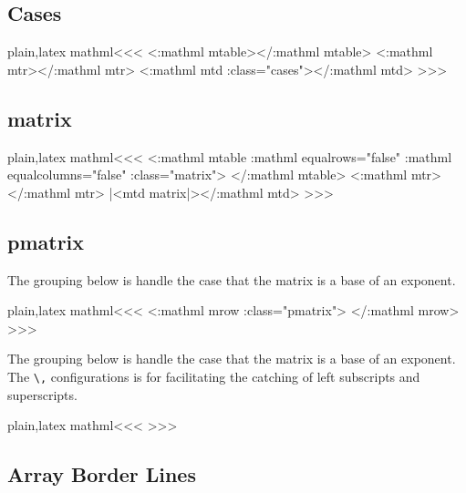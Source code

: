 {{{{{{%
\subsection{Cases}

\<plain,latex mathml\><<<
    {}{} {\Tg<\a:mathml mtable>}{\Tg</\a:mathml mtable>}
    {\Tg<\a:mathml mtr>}{\Tg</\a:mathml mtr>}
    {\Tg<\a:mathml mtd \mml:class="cases">}{\Tg</\a:mathml mtd>}
>>>


\subsection{matrix}

\<plain,latex mathml\><<<
   {\Tg<\a:mathml mtable 
        \a:mathml equalrows="false" \a:mathml equalcolumns="false"\Hnewline
          \mml:class="matrix">} 
   {\Tg</\a:mathml mtable>}
   {\Tg<\a:mathml mtr>}{\Tg</\a:mathml mtr>}
   {|<mtd matrix|>}{\Tg</\a:mathml mtd>}
>>>



\subsection{pmatrix}


The grouping below is handle the case that the matrix is a base of an exponent.


\<plain,latex mathml\><<<
  {\bgroup\Tg<\a:mathml mrow\Hnewline
   \mml:class="pmatrix">}  {\Tg</\a:mathml mrow>\egroup}
>>>



The grouping below is handle the case that the matrix is a base of an
exponent. The \verb|\,| configurations is for facilitating the
catching of  left subscripts and superscripts.


\<plain,latex mathml\><<<
\Configure{,}
   {{}}
>>>


\subsection{Array Border Lines}


}}}}}}
